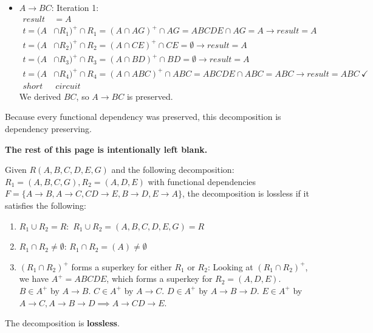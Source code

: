 \documentclass{report}
\newenvironment{example}{\begin{tcolorbox}[title={Example},colback=green!5!white,colframe=black!75!green]}{\end{tcolorbox}}
\renewcommand{\bf}[1]{\textbf{{#1}}}
\begin{document}
\begin{example}
\begin{itemize}[label=, itemsep=0em, leftmargin=*]
        \item $A \to BC$:
            \newline
            \noindent Iteration 1:
            \vspace{-1em}
            \begin{align*}
                result &= A \\
                t = (A &\cap R_1)^+ \cap R_1
                = (A \cap AG)^+ \cap AG
                = ABCDE \cap AG = A \to result = A \\
                t = (A &\cap R_2)^+ \cap R_2
                = (A \cap CE)^+ \cap CE
                = \emptyset \to result = A \\
                t = (A &\cap R_3)^+ \cap R_3
                = (A \cap BD)^+ \cap BD
                = \emptyset \to result = A \\
                t = (A &\cap R_4)^+ \cap R_4
                = (A \cap ABC)^+ \cap ABC
                = ABCDE \cap ABC = ABC \to result = ABC \ \checkmark \\
                short &\ circuit
            \end{align*}
            We derived $BC$, so $A \to BC$ is preserved.
    \end{itemize}
    Because every functional dependency was preserved, this decomposition is dependency preserving.
\end{example}
\vspace{5em}

\begin{center}
    \bf{The rest of this page is intentionally left blank.}
\end{center}

\begin{example}
    Given $R(A, B, C, D, E, G)$ and the following decomposition: $R_1 = (A, B, C, G), R_2 = (A, D, E)$
    with functional dependencies $F = \{ A \to B, A \to C, CD \to E, B \to D, E \to A \}$,
    the decomposition is lossless if it satisfies the following:
    \begin{enumerate}
        \item $R_1 \cup R_2 = R:$ $R_1 \cup R_2 = (A, B, C, D, E, G) = R$ \checkmark
        \item $R_1 \cap R_2 \neq \emptyset$: $R_1 \cap R_2 = (A) \neq \emptyset$ \checkmark
        \item $(R_1 \cap R_2)^+$ forms a superkey for either $R_1$ or $R_2$:
            Looking at $(R_1 \cap R_2)^+$, we have
            $A^+ = ABCDE$, which forms a superkey for $R_2 = (A, D, E)$.
            \newline
            $B \in A^+$ by $A \to B$.
            \newline
            $C \in A^+$ by $A \to C$.
            \newline
            $D \in A^+$ by $A \to B \to D$.
            \newline
            $E \in A^+$ by $A \to C, A \to B \to D \implies A \to CD \to E$. \checkmark
    \end{enumerate}
    \noindent The decomposition is \bf{lossless}.
\end{example}
\end{document}
